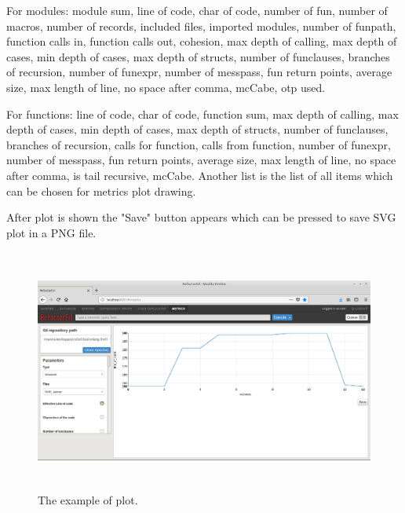 For modules: module sum, line of code, char of code, number of fun, number of macros, number of records, included files, imported modules, number of funpath, function calls in, function calls out, cohesion, max depth of calling, max depth of cases, min depth of cases, max depth of structs, number of funclauses, branches of recursion, number of funexpr, number of messpass, fun return points, average size, max length of line, no space after comma, mcCabe, otp used.

For functions: line of code, char of code, function sum, max depth of calling, max depth of cases, min depth of cases, max depth of structs, number of funclauses, branches of recursion, calls for function, calls from function, number of funexpr, number of messpass, fun return points, average size, max length of line, no space after comma, is tail recursive, mcCabe. Another list is the list of all items which can be chosen for metrics plot drawing. 

After plot is shown the "Save" button appears which can be pressed to save SVG plot in a PNG file. 

\begin{figure}[h]
	\includegraphics[height=80mm]{figures/plot.png}
	\caption{The example of plot.}
	\label{fig:metrics_plot}
\end{figure}